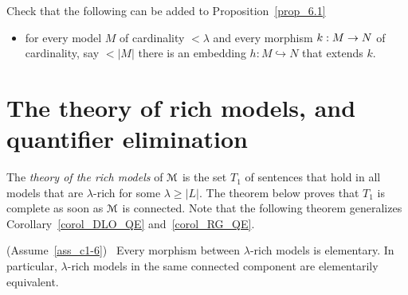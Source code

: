 \begin{exercise}
  Check that the following can be added to Proposition~\ref{prop_6.1}
  \begin{itemize}
    \item[3.] for every model $M$ of cardinality $<\lambda$ and every morphism $k:M\rightarrow N$ of cardinality, say $<|M|$ there is an embedding $h:M\hookrightarrow N$ that extends $k$.
  \end{itemize}
\end{exercise}
\section{The theory of rich models, and quantifier elimination}

The \emph{theory of the rich models\/} of $\EuScript M$ is the set $T_1$ of sentences that hold in all models that are $\lambda$-rich for some $\lambda\ge|L|$.
The theorem below proves that $T_1$ is complete as soon as $\EuScript M$ is connected.
Note that the following theorem generalizes Corollary~\ref{corol_DLO_QE} and~\ref{corol_RG_QE}.

\begin{theorem}\label{thm_morphism_rich_elementary}
(Assume~\ref{ass_c1-6})  \  Every morphism between $\lambda$-rich models is elementary.
In particular, $\lambda$-rich models in the same connected component are elementarily equivalent.
\end{theorem}

